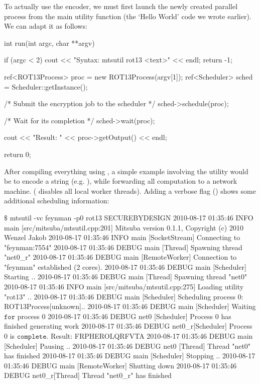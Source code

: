 To actually use the  encoder, we must first launch the newly created parallel process
from the main utility function (the `Hello World' code we wrote earlier). We can adapt it as follows:
\begin{cpp}
    int run(int argc, char **argv) {
        if (argc < 2) {
            cout << "Syntax: mtsutil rot13 <text>" << endl;
            return -1;
        }

        ref<ROT13Process> proc = new ROT13Process(argv[1]);
        ref<Scheduler> sched = Scheduler::getInstance();

        /* Submit the encryption job to the scheduler */
        sched->schedule(proc);

        /* Wait for its completion */
        sched->wait(proc);

        cout << "Result: " << proc->getOutput() << endl;

        return 0;
    }
\end{cpp}
After compiling everything using , a simple example
involving the utility would be to encode a string (e.g. ), while
forwarding all computation to a network machine. ( disables
all local worker threads). Adding a verbose flag () shows
some additional scheduling information:
\begin{shell}
$\texttt{\$}$ mtsutil -vc feynman -p0 rot13 SECUREBYDESIGN
2010-08-17 01:35:46 INFO  main [src/mitsuba/mtsutil.cpp:201] Mitsuba version 0.1.1, Copyright (c) 2010 Wenzel Jakob
2010-08-17 01:35:46 INFO  main [SocketStream] Connecting to "feynman:7554"
2010-08-17 01:35:46 DEBUG main [Thread] Spawning thread "net0_r"
2010-08-17 01:35:46 DEBUG main [RemoteWorker] Connection to "feynman" established (2 cores).
2010-08-17 01:35:46 DEBUG main [Scheduler] Starting ..
2010-08-17 01:35:46 DEBUG main [Thread] Spawning thread "net0"
2010-08-17 01:35:46 INFO  main [src/mitsuba/mtsutil.cpp:275] Loading utility "rot13" ..
2010-08-17 01:35:46 DEBUG main [Scheduler] Scheduling process 0: ROT13Process[unknown]..
2010-08-17 01:35:46 DEBUG main [Scheduler] Waiting $\texttt{for}$ process 0
2010-08-17 01:35:46 DEBUG net0 [Scheduler] Process 0 has finished generating work
2010-08-17 01:35:46 DEBUG net0_r[Scheduler] Process 0 is $\texttt{complete}$.
Result: FRPHEROLQRFVTA
2010-08-17 01:35:46 DEBUG main [Scheduler] Pausing ..
2010-08-17 01:35:46 DEBUG net0 [Thread] Thread "net0" has finished
2010-08-17 01:35:46 DEBUG main [Scheduler] Stopping ..
2010-08-17 01:35:46 DEBUG main [RemoteWorker] Shutting down
2010-08-17 01:35:46 DEBUG net0_r[Thread] Thread "net0_r" has finished
\end{shell}
